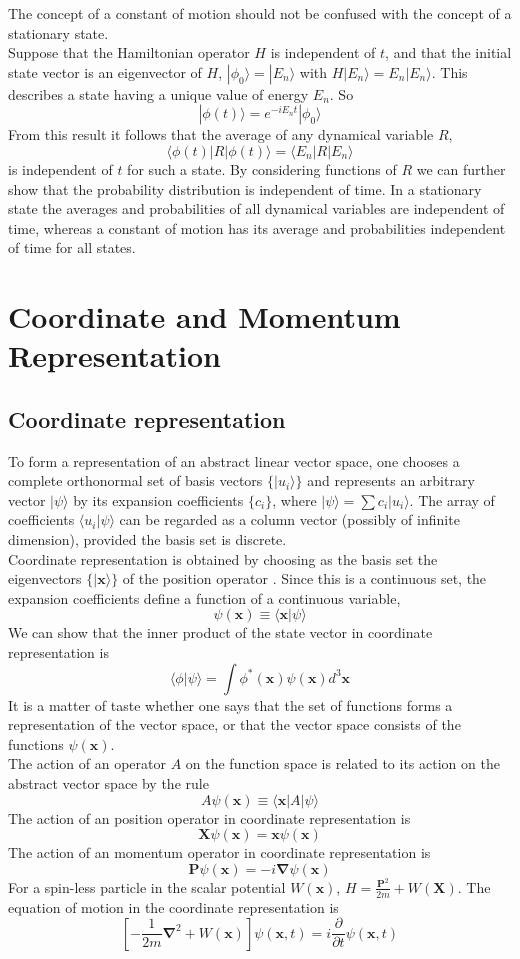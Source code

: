 \begin{note}
The concept of a constant of motion should not be confused with the
concept of a stationary state. \\
Suppose that the Hamiltonian operator $H$ is independent of $t$, and that the initial state vector is an eigenvector of $H$, $|\phi_0\rangle = | E_n \rangle$ with $H |E_n\rangle = E_n | E_n \rangle$. This describes a state having a unique value of energy $E_n$. So
\[|\phi(t)\rangle = e^{-iE_nt} |\phi_0\rangle\]
From this result it follows that the average of any dynamical variable $R$,
\[\langle \phi(t) | R | \phi(t) \rangle = \langle E_n | R | E_n \rangle\]
is independent of $t$ for such a state. By considering functions of $R$ we can further show that the probability distribution is independent of time. In a stationary state the averages and probabilities of all dynamical variables are independent of time, whereas a constant of motion has its average and probabilities independent of time for all states.
\end{note}
\chapter{Coordinate and Momentum Representation}
\section{Coordinate representation}
To form a representation of an abstract linear vector space, one chooses a complete orthonormal set of basis vectors $\{|u_i\rangle\}$ and represents an arbitrary vector $|\psi\rangle$ by its expansion coefficients $\{c_i\}$, where $|\psi\rangle = \sum c_i |u_i\rangle$. 
The array of coefficients $\langle u_i | \psi \rangle$ can be regarded as a column vector (possibly of infinite dimension), provided the basis set is discrete.\\
Coordinate representation is obtained by choosing as the basis set the eigenvectors $\{|\bm{x}\rangle\}$ of the position operator . Since this is a continuous set, the expansion coefficients define a function of a continuous variable,
\[\psi(\bm{x})  \equiv \langle \bm{x} | \psi \rangle\]
We can show that the inner product of the state vector in coordinate representation is
\[\langle \phi | \psi \rangle = \int \phi^{*}(\bm{x})\psi(\bm{x}) d^3\bm{x} \]
It is a matter of taste whether one says that the set of functions forms a representation of the vector space, or that the vector space consists of the functions $\psi(\bm{x})$.\\
The action of an operator $A$ on the function space is related to its action on the abstract vector space by the rule
\[A \psi(\bm{x}) \equiv  \langle \bm{x} |A| \psi \rangle\]
The action of an position operator in coordinate representation is
\[\bm{X}\psi(\bm{x}) = \bm{x} \psi(\bm{x})\]
The action of an momentum operator in coordinate representation is
\[\bm{P}\psi(\bm{x}) = -i \bm{\nabla}\psi(\bm{x})\]
For a spin-less particle in the scalar potential $W(\bm{x})$,
$H = \frac{\bm{P}^2}{2m} + W(\bm{X})$. 
The equation of motion in the coordinate representation is
\[ \left[- \frac{1}{2m} \bm{\nabla}^2 + W(\bm{x}) \right] \psi(\bm{x},t) = i\frac{\partial}{\partial t}\psi(\bm{x},t)\]

